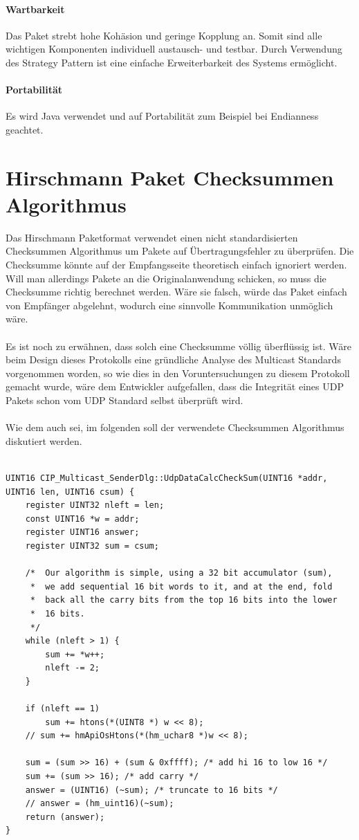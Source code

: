 \paragraph{Wartbarkeit} Das Paket strebt hohe
Kohäsion und geringe Kopplung an. Somit sind alle wichtigen Komponenten
individuell austausch- und testbar. Durch Verwendung des Strategy Pattern ist eine einfache Erweiterbarkeit des Systems
ermöglicht.

\paragraph{Portabilität} Es wird Java verwendet und auf Portabilität zum Beispiel
bei Endianness geachtet.

\section{Hirschmann Paket Checksummen Algorithmus}

Das Hirschmann Paketformat verwendet einen nicht standardisierten Checksummen Algorithmus 
um Pakete auf Übertragungsfehler zu überprüfen. 
Die Checksumme könnte auf der Empfangsseite theoretisch einfach ignoriert werden. Will man allerdings
Pakete an die Originalanwendung schicken, so muss die Checksumme richtig berechnet werden. Wäre sie falsch,
würde das Paket einfach von Empfänger abgelehnt, wodurch eine sinnvolle Kommunikation
unmöglich wäre.
\\
\\
Es ist noch zu erwähnen, dass solch eine Checksumme völlig überflüssig ist. 
Wäre beim Design dieses Protokolls eine gründliche Analyse des Multicast Standards vorgenommen worden, so wie dies in den Voruntersuchungen zu diesem Protokoll gemacht wurde, wäre dem Entwickler aufgefallen, dass die 
Integrität eines UDP Pakets schon vom UDP Standard selbst überprüft wird.
\\\\
Wie dem auch sei, im folgenden soll der verwendete Checksummen Algorithmus diskutiert werden.

\newpage
\begin{lstlisting}

UINT16 CIP_Multicast_SenderDlg::UdpDataCalcCheckSum(UINT16 *addr, UINT16 len, UINT16 csum) {
    register UINT32 nleft = len;
    const UINT16 *w = addr;
    register UINT16 answer;
    register UINT32 sum = csum;

    /*  Our algorithm is simple, using a 32 bit accumulator (sum),
     *  we add sequential 16 bit words to it, and at the end, fold
     *  back all the carry bits from the top 16 bits into the lower
     *  16 bits.
     */
    while (nleft > 1) {
        sum += *w++;
        nleft -= 2;
    }

    if (nleft == 1)
        sum += htons(*(UINT8 *) w << 8);
    // sum += hmApiOsHtons(*(hm_uchar8 *)w << 8);

    sum = (sum >> 16) + (sum & 0xffff); /* add hi 16 to low 16 */
    sum += (sum >> 16); /* add carry */
    answer = (UINT16) (~sum); /* truncate to 16 bits */
    // answer = (hm_uint16)(~sum);  
    return (answer);
}
\end{lstlisting}

